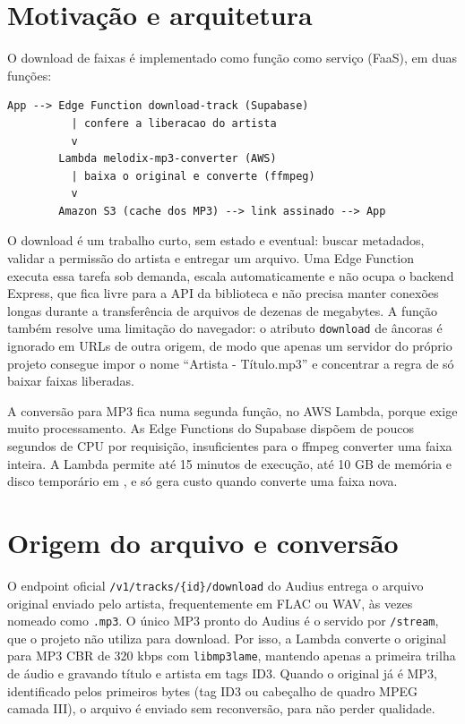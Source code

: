 \documentclass[12pt,a4paper,oneside]{report}
\newcommand{\arquivo}[1]{\texttt{\detokenize{#1}}}
\begin{document}
\section{Motivação e arquitetura}
O download de faixas é implementado como função como serviço (FaaS), em duas funções:
\begin{lstlisting}
App --> Edge Function download-track (Supabase)
          | confere a liberacao do artista
          v
        Lambda melodix-mp3-converter (AWS)
          | baixa o original e converte (ffmpeg)
          v
        Amazon S3 (cache dos MP3) --> link assinado --> App
\end{lstlisting}

O download é um trabalho curto, sem estado e eventual: buscar metadados, validar a permissão do artista e entregar um arquivo. Uma Edge Function executa essa tarefa sob demanda, escala automaticamente e não ocupa o backend Express, que fica livre para a API da biblioteca e não precisa manter conexões longas durante a transferência de arquivos de dezenas de megabytes. A função também resolve uma limitação do navegador: o atributo \texttt{download} de âncoras é ignorado em URLs de outra origem, de modo que apenas um servidor do próprio projeto consegue impor o nome ``Artista - Título.mp3'' e concentrar a regra de só baixar faixas liberadas.

A conversão para MP3 fica numa segunda função, no AWS Lambda, porque exige muito processamento. As Edge Functions do Supabase dispõem de poucos segundos de CPU por requisição, insuficientes para o ffmpeg converter uma faixa inteira. A Lambda permite até 15 minutos de execução, até 10 GB de memória e disco temporário em \arquivo{/tmp}, e só gera custo quando converte uma faixa nova.

\section{Origem do arquivo e conversão}
O endpoint oficial \texttt{/v1/tracks/\{id\}/download} do Audius entrega o arquivo original enviado pelo artista, frequentemente em FLAC ou WAV, às vezes nomeado como \texttt{.mp3}. O único MP3 pronto do Audius é o servido por \texttt{/stream}, que o projeto não utiliza para download. Por isso, a Lambda converte o original para MP3 CBR de 320 kbps com \texttt{libmp3lame}, mantendo apenas a primeira trilha de áudio e gravando título e artista em tags ID3. Quando o original já é MP3, identificado pelos primeiros bytes (tag ID3 ou cabeçalho de quadro MPEG camada III), o arquivo é enviado sem reconversão, para não perder qualidade.
\end{document}
